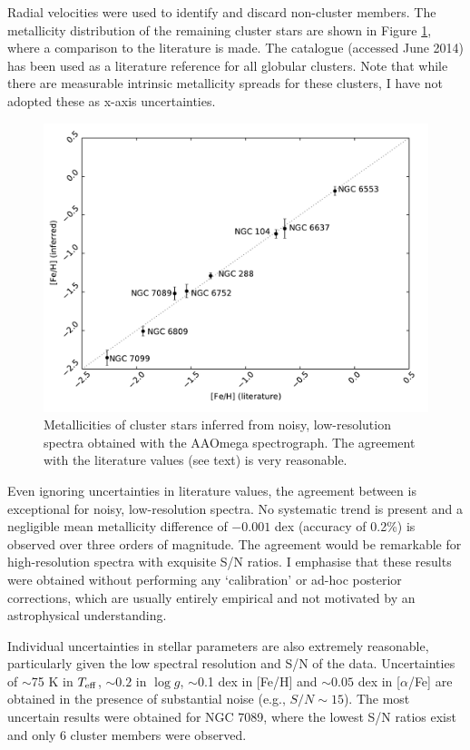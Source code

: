 \documentclass{aastex}
\begin{document}
Radial velocities were used to identify and discard non-cluster members. The 
metallicity distribution of the remaining cluster stars are shown in Figure 
\ref{fig:clusters}, where a comparison to the literature is made. The 
\citet{harris} catalogue (accessed June 2014) has been used as a literature 
reference for all globular clusters. Note that while there are measurable 
intrinsic metallicity spreads for these clusters, I have not adopted these as 
x-axis uncertainties.

\begin{figure}
\label{fig:clusters}
\includegraphics[width=\textwidth]{clusters.pdf}
\caption{Metallicities of cluster stars inferred from noisy, low-resolution 
spectra obtained with the AAOmega spectrograph. The agreement with the 
literature values (see text) is very reasonable.}
\end{figure}

Even ignoring uncertainties in literature values, the agreement between is 
exceptional for noisy, low-resolution spectra. No systematic trend is present 
and a negligible mean metallicity difference of $-0.001$ dex (accuracy of 0.2\%) 
is observed over three orders of magnitude. The agreement would be remarkable 
for high-resolution spectra with exquisite S/N ratios. I emphasise that these 
results were obtained without performing any `calibration' or ad-hoc posterior 
corrections, which are usually entirely empirical and not motivated by an 
astrophysical understanding.

Individual uncertainties in stellar parameters are also extremely reasonable, 
particularly given the low spectral resolution and S/N of the data. Uncertainties 
of $\sim$75 K in $T_{\rm eff}$, $\sim0.2$ in $\log{g}$, $\sim$0.1 dex in [Fe/H] 
and $\sim0.05$ dex in [$\alpha$/Fe] are obtained in the presence of substantial 
noise (e.g., $S/N \sim 15$). The most uncertain results were obtained for 
NGC 7089, where the lowest S/N ratios exist and only 6 cluster members were 
observed.
\end{document}
